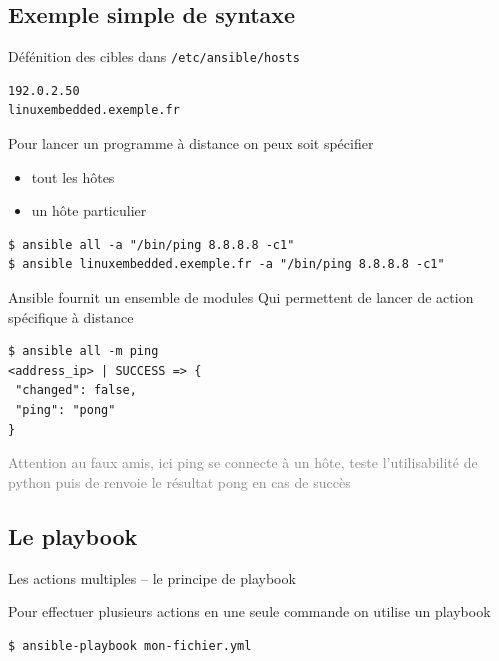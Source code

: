 \documentclass[compress]{smilebeamer}
\begin{document}
\subsection{Exemple simple de syntaxe}

\begin{frame}[fragile]
Défénition des cibles dans \texttt{/etc/ansible/hosts}
\begin{lstlisting}
192.0.2.50
linuxembedded.exemple.fr
\end{lstlisting}
\end{frame}

\begin{frame}[fragile]
Pour lancer un programme à distance on peux soit spécifier
\begin{itemize}
	\item tout les hôtes
	\item un hôte particulier
\end{itemize}
\begin{lstlisting}[style=shell]
$ ansible all -a "/bin/ping 8.8.8.8 -c1"
$ ansible linuxembedded.exemple.fr -a "/bin/ping 8.8.8.8 -c1"
\end{lstlisting}
\end{frame}

\begin{frame}[fragile]
Ansible fournit un ensemble de modules\newline
Qui permettent de lancer de action spécifique à distance
\begin{lstlisting}[style=shell]
$ ansible all -m ping
<address_ip> | SUCCESS => {
 "changed": false, 
 "ping": "pong"
}
\end{lstlisting}
\textcolor{gray}{\tiny{Attention au faux amis, ici ping se connecte à un hôte, teste l’utilisabilité de python puis de renvoie le résultat pong en cas de succès}}
\end{frame}

\subsection{Le playbook}

\begin{frame}
\begin{center}
\textcolor{smileOrange}{\huge{Les actions multiples – le principe de playbook}}
\end{center}
\end{frame}

\begin{frame}[fragile]
Pour effectuer plusieurs actions en une seule commande on utilise un playbook
\begin{lstlisting}[style=shell]
$ ansible-playbook mon-fichier.yml
\end{lstlisting}
\end{frame}
\end{document}
